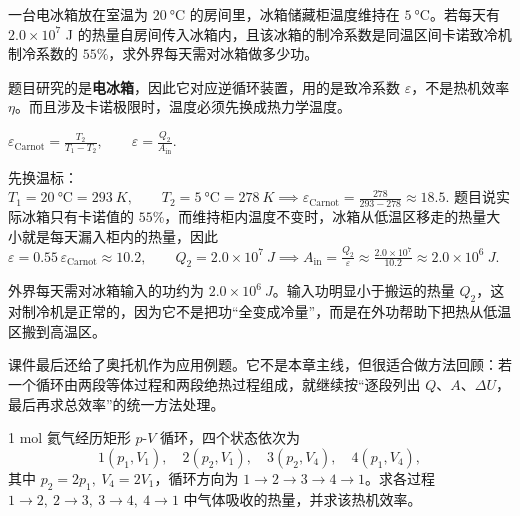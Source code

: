 \documentclass[lang=cn,11pt]{elegantbook}
\begin{document}
\begin{exercise}[电冰箱的输入功怎样由致冷系数反推]
一台电冰箱放在室温为 \(\SI{20}{\celsius}\) 的房间里，冰箱储藏柜温度维持在 \(\SI{5}{\celsius}\)。若每天有 \(2.0\times10^7\) J 的热量自房间传入冰箱内，且该冰箱的制冷系数是同温区间卡诺致冷机制冷系数的 \(55\%\)，求外界每天需对冰箱做多少功。
\end{exercise}

\begin{solution}
题目研究的是\textbf{电冰箱}，因此它对应逆循环装置，用的是致冷系数 \(\varepsilon\)，不是热机效率 \(\eta\)。而且涉及卡诺极限时，温度必须先换成热力学温度。

 \(\varepsilon_{\text{Carnot}}=\frac{T_2}{T_1-T_2},\qquad \varepsilon=\frac{Q_2}{A_{\text{in}}}.\) 

先换温标：
 \(T_1=\SI{20}{\celsius}=293\ \si{K},\qquad T_2=\SI{5}{\celsius}=278\ \si{K} \implies \varepsilon_{\text{Carnot}}=\frac{278}{293-278}\approx 18.5.\) 
题目说实际冰箱只有卡诺值的 \(55\%\)，而维持柜内温度不变时，冰箱从低温区移走的热量大小就是每天漏入柜内的热量，因此
 \(\varepsilon=0.55\,\varepsilon_{\text{Carnot}}\approx 10.2,\qquad Q_2=2.0\times10^7\ \si{J} \implies A_{\text{in}}=\frac{Q_2}{\varepsilon} \approx \frac{2.0\times10^7}{10.2} \approx 2.0\times10^6\ \si{J}.\) 

外界每天需对冰箱输入的功约为 \(2.0\times10^6\ \si{J}\)。输入功明显小于搬运的热量 \(Q_2\)，这对制冷机是正常的，因为它不是把功“全变成冷量”，而是在外功帮助下把热从低温区搬到高温区。
\end{solution}

\begin{note}
课件最后还给了奥托机作为应用例题。它不是本章主线，但很适合做方法回顾：若一个循环由两段等体过程和两段绝热过程组成，就继续按“逐段列出 \(Q\)、\(A\)、\(\Delta U\)，最后再求总效率”的统一方法处理。
\end{note}

\begin{exercise}
1 mol 氦气经历矩形 \(p\)-\(V\) 循环，四个状态依次为
\[
1(p_1,V_1),\quad 2(p_2,V_1),\quad 3(p_2,V_4),\quad 4(p_1,V_4),
\]
其中 \(p_2=2p_1,\ V_4=2V_1\)，循环方向为 \(1\to2\to3\to4\to1\)。求各过程 \(1\to2,\ 2\to3,\ 3\to4,\ 4\to1\) 中气体吸收的热量，并求该热机效率。
\end{exercise}
\end{document}
